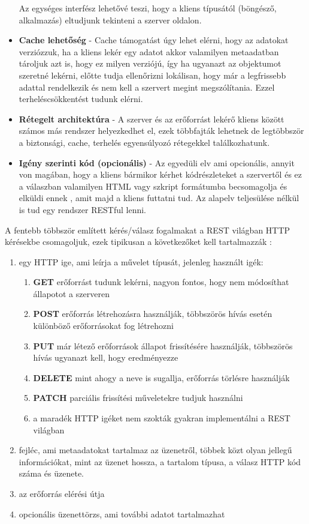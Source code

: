 \begin{itemize}
\begin{enumerate}
	\end{enumerate}
	Az egységes interfész lehetővé teszi, hogy a kliens típusától (böngésző, alkalmazás) eltudjunk tekinteni a szerver oldalon.
	\item \textbf{Cache lehetőség} - Cache támogatást úgy lehet elérni, hogy az adatokat verziózzuk, ha a kliens lekér egy adatot akkor valamilyen metaadatban tároljuk azt is, hogy ez milyen verziójú, így ha ugyanazt az objektumot szeretné lekérni, előtte tudja ellenőrizni lokálisan, hogy már a legfrissebb adattal rendelkezik és nem kell a szervert megint megszólítania. Ezzel terheléscsökkentést tudunk elérni.
	\item \textbf{Rétegelt architektúra} - A szerver és az erőforrást lekérő kliens között számos más rendszer helyezkedhet el, ezek többfajták lehetnek de legtöbbször a biztonsági, cache, terhelés egyensúlyozó rétegekkel találkozhatunk.
	\item \textbf{Igény szerinti kód (opcionális)} - Az egyedüli elv ami opcionális, annyit von magában, hogy a kliens bármikor kérhet kódrészleteket a szervertől és ez a válaszban valamilyen HTML vagy szkript formátumba becsomagolja és elküldi ennek , amit majd a kliens futtatni tud. Az alapelv teljesülése nélkül is tud egy rendszer RESTful lenni.
\end{itemize}

A fentebb többször említett kérés/válasz fogalmakat a REST világban HTTP kérésekbe csomagoljuk, ezek tipikusan a következőket kell tartalmazzák :
\begin{enumerate}
	\item egy HTTP ige, ami leírja a művelet típusát, jelenleg használt igék:
	\begin{enumerate}
		\item \textbf{GET} erőforrást tudunk lekérni, nagyon fontos, hogy nem módosíthat állapotot a szerveren
		\item \textbf{POST} erőforrás létrehozásra használják, többszörös hívás esetén különböző erőforrásokat fog létrehozni
		\item \textbf{PUT} már létező erőforrások állapot frissítésére használják, többszörös hívás ugyanazt kell, hogy eredményezze
		\item \textbf{DELETE} mint ahogy a neve is sugallja, erőforrás törlésre használják 
		\item \textbf{PATCH} parciális frissítési műveletekre tudjuk használni
		\item a maradék HTTP igéket nem szokták gyakran implementálni a REST világban
	\end{enumerate} 
	\item fejléc, ami metaadatokat tartalmaz az üzenetről, többek közt olyan jellegű információkat, mint az üzenet hossza, a tartalom típusa, a válasz HTTP kód száma és üzenete.
	\item az erőforrás elérési útja
	\item opcionális üzenettörzs, ami további adatot tartalmazhat
\end{enumerate}


